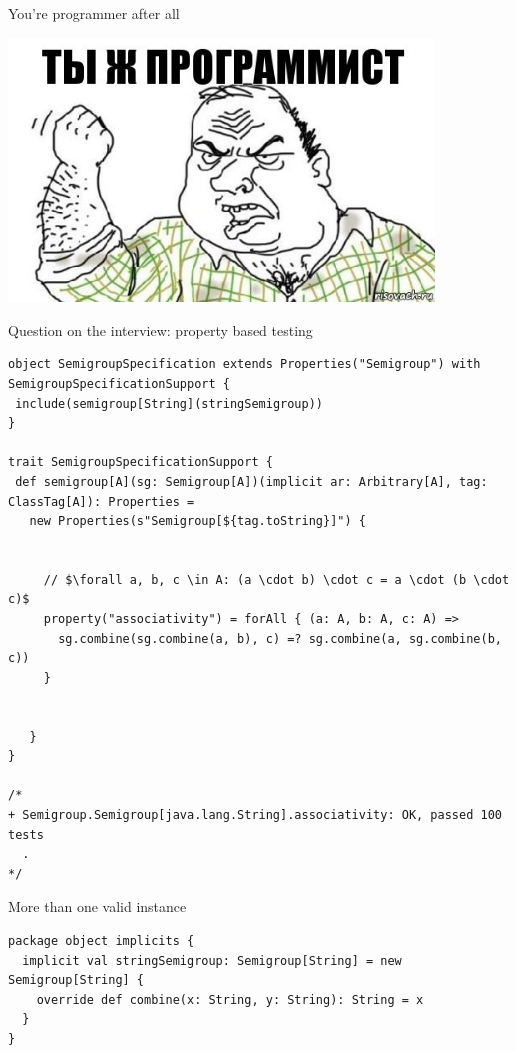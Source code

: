 \documentclass[presentation,aspectratio=169,smaller]{beamer}
\begin{document}
\begin{frame}[label={sec:org1fde1b2}]{You're programmer after all}
\begin{center}
\includegraphics[height=7cm]{images/you-re-programmer.jpg}
\end{center}
\end{frame}

\begin{frame}[label={sec:org4472b19},fragile]{Question on the interview: property based testing}
 \begin{verbatim}
object SemigroupSpecification extends Properties("Semigroup") with SemigroupSpecificationSupport {
 include(semigroup[String](stringSemigroup))
}

trait SemigroupSpecificationSupport {
 def semigroup[A](sg: Semigroup[A])(implicit ar: Arbitrary[A], tag: ClassTag[A]): Properties =
   new Properties(s"Semigroup[${tag.toString}]") {


     // $\forall a, b, c \in A: (a \cdot b) \cdot c = a \cdot (b \cdot c)$
     property("associativity") = forAll { (a: A, b: A, c: A) =>
       sg.combine(sg.combine(a, b), c) =? sg.combine(a, sg.combine(b, c))
     }


   }
}

/*
+ Semigroup.Semigroup[java.lang.String].associativity: OK, passed 100 tests
  .
*/
\end{verbatim}
\end{frame}

\begin{frame}[label={sec:org11f9c26},fragile]{More than one valid instance}
 \begin{verbatim}
package object implicits {
  implicit val stringSemigroup: Semigroup[String] = new Semigroup[String] {
    override def combine(x: String, y: String): String = x
  }
}
\end{verbatim}
\end{frame}
\end{document}
